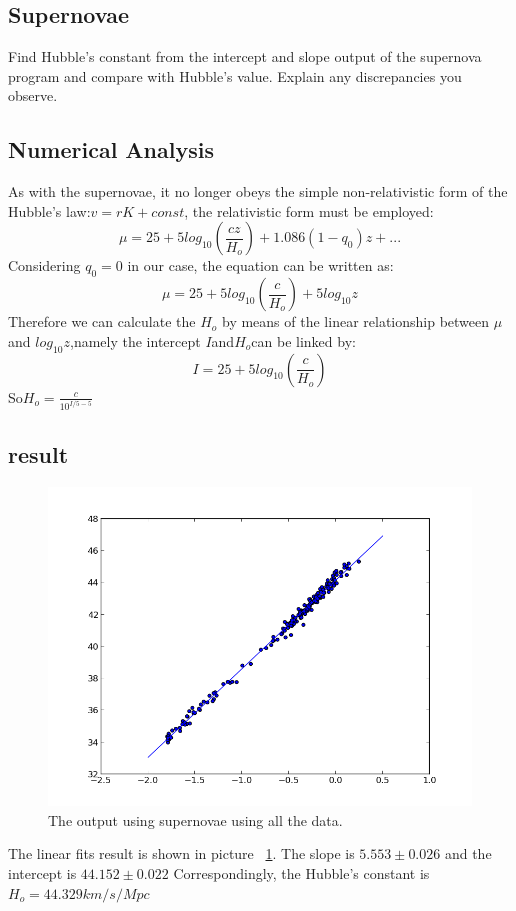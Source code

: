 \documentclass[11pt,letterpaper]{article}
\begin{document}
\subsection{Supernovae}
Find Hubble's constant from the intercept and slope output of the supernova program and compare with Hubble's value. Explain any discrepancies you observe.

\subsection{Numerical Analysis}
As with the supernovae, it no longer obeys the simple non-relativistic form of the Hubble's law:$v=rK+const$, the relativistic form must be employed:
$$
\mu=25+5log_{10}(\frac{cz}{H_o})+1.086(1-q_0)z+...
$$
Considering $q_0=0$ in our case, the equation can be written as:
$$
\mu=25+5log_{10}(\frac{c}{H_o})+5log_{10}z
$$
Therefore we can calculate the $H_o$ by means of the linear relationship between $\mu$ and $log_{10}z$,namely the intercept $I$and$H_o$can be linked by:
$$
I=25+5log_{10}(\frac{c}{H_o})
$$ 
So$H_o=\frac{c}{10^{{I/5}-5}}$

\subsection{result}

\begin{figure}
\begin{center}
\includegraphics[width=0.6\linewidth,angle=0]{supernovaall.png}
\caption{The output using supernovae using all the data.}
\label{figure4}
\end{center}
\end{figure}

The linear fits result is shown in picture ~\ref{figure4}.
The slope is $5.553\pm0.026$ and the intercept is $44.152\pm0.022$
Correspondingly, the Hubble's constant is $H_o=44.329km/s/Mpc$

\newpage
\end{document}
